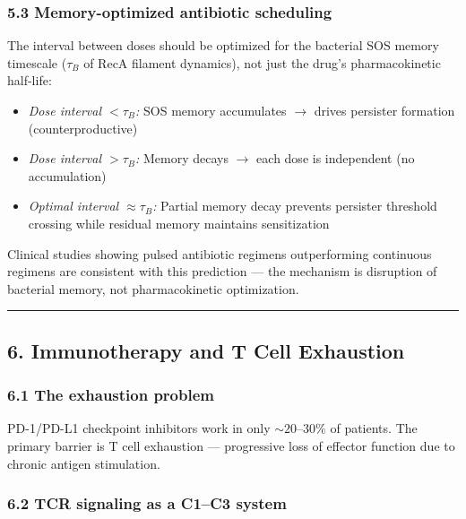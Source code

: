 \documentclass[
  11pt,
]{article}
\providecommand{\tightlist}{%
  \setlength{\itemsep}{0pt}\setlength{\parskip}{0pt}}
\begin{document}
\hypertarget{memory-optimized-antibiotic-scheduling}{%
\subsubsection{5.3 Memory-optimized antibiotic
scheduling}\label{memory-optimized-antibiotic-scheduling}}

The interval between doses should be optimized for the bacterial SOS
memory timescale (\(\tau_B\) of RecA filament dynamics), not just the
drug's pharmacokinetic half-life:

\begin{itemize}
\tightlist
\item
  \emph{Dose interval \(< \tau_B\):} SOS memory accumulates \(\to\)
  drives persister formation (counterproductive)
\item
  \emph{Dose interval \(> \tau_B\):} Memory decays \(\to\) each dose is
  independent (no accumulation)
\item
  \emph{Optimal interval \(\approx \tau_B\):} Partial memory decay
  prevents persister threshold crossing while residual memory maintains
  sensitization
\end{itemize}

Clinical studies showing pulsed antibiotic regimens outperforming
continuous regimens are consistent with this prediction --- the
mechanism is disruption of bacterial memory, not pharmacokinetic
optimization.

\begin{center}\rule{0.5\linewidth}{0.5pt}\end{center}

\hypertarget{immunotherapy-and-t-cell-exhaustion}{%
\subsection{6. Immunotherapy and T Cell
Exhaustion}\label{immunotherapy-and-t-cell-exhaustion}}

\hypertarget{the-exhaustion-problem}{%
\subsubsection{6.1 The exhaustion
problem}\label{the-exhaustion-problem}}

PD-1/PD-L1 checkpoint inhibitors work in only \(\sim 20\)--\(30\%\) of
patients. The primary barrier is T cell exhaustion --- progressive loss
of effector function due to chronic antigen stimulation.

\hypertarget{tcr-signaling-as-a-c1c3-system}{%
\subsubsection{6.2 TCR signaling as a C1--C3
system}\label{tcr-signaling-as-a-c1c3-system}}
\end{document}
